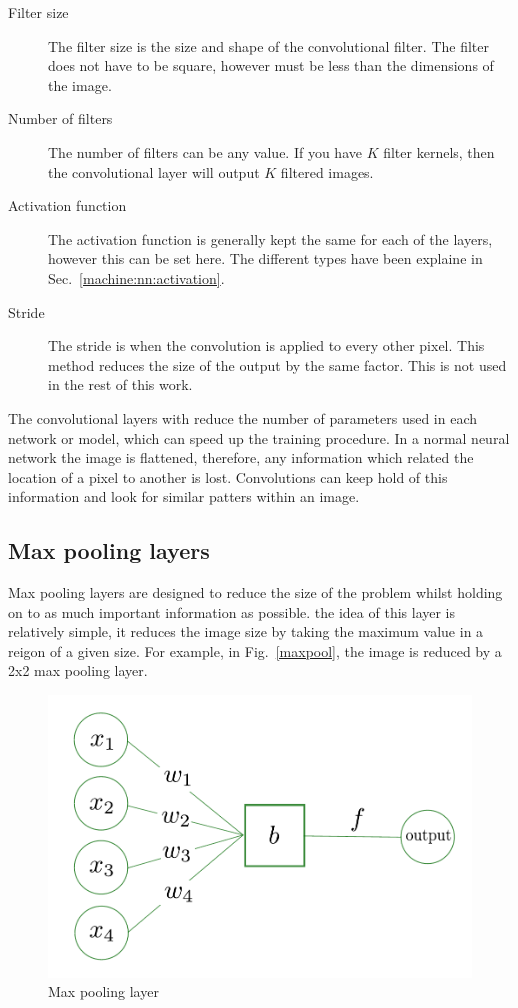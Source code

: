 \begin{description}
\item[Filter size] The filter size is the size and shape of the convolutional filter. The filter does not have to be square, however must be less than the dimensions of the image.

\item[Number of filters] The number of filters can be any value. If you have $K$ filter kernels, then the convolutional layer will output $K$ filtered images.

\item[Activation function] The activation function is generally kept the same for each of the layers, however this can be set here. The different types have been explaine in Sec.~\ref{machine:nn:activation}.

\item[Stride] The stride is when the convolution is applied to every other pixel. This method reduces the size of the output by the same factor. This is not used in the rest of this work.
\end{description}

The convolutional layers with reduce the number of parameters used in each network or model, which can speed up the training procedure.
In a normal neural network the image is flattened, therefore, any information which related the location of a pixel to another is lost. 
Convolutions can keep hold of this information and look for similar patters within an image.

\subsection{Max pooling layers}

Max pooling layers are designed to reduce the size of the problem whilst holding on to as much important information as possible.
the idea of this layer is relatively simple, it reduces the image size by taking the maximum value in a reigon of a given size.
For example, in Fig.~\ref{maxpool}, the image is reduced by a 2x2 max pooling layer.

\begin{figure}
    \centering
    \includegraphics[width=0.5\columnwidth]{C3_cnn/neuron.pdf}
    \caption{Max pooling layer}
    \label{fig:my_label}
\end{figure}

